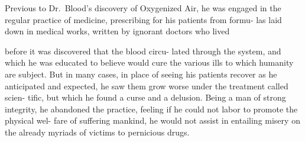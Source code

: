 \documentclass[10pt]{article}
\begin{document}
\begin{multicols}{3}
Previous to Dr.~Blood's discovery of Oxygenized Air, he was engaged\linebreak
in the regular practice of medicine, prescribing for his patients from formu-\linebreak
las laid down in medical works, written by ignorant doctors who lived%
\begin{figure}
\vfill
\end{figure}
before it was discovered that the blood circu-\linebreak
lated through the system, and which he was\linebreak
educated to believe would cure the various ills\linebreak
to which humanity are subject. But in many\linebreak
cases, in place of seeing his patients recover\linebreak
as he anticipated and expected, he saw them\linebreak
grow worse under the treatment called scien-\linebreak
tific, but which he found a curse and a\linebreak
delusion. Being a man of strong integrity,\linebreak
he abandoned the practice, feeling if he\linebreak
could not labor to promote the physical wel-\linebreak
fare of suffering mankind, he would not assist\linebreak
in entailing misery on the already myriads of\linebreak
victims to pernicious drugs.


\end{multicols}
\end{document}
